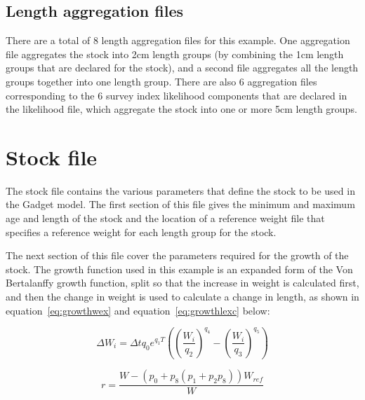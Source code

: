 \documentclass[10pt,titlepage]{article}
\begin{document}
\subsection{Length aggregation files}

There are a total of 8 length aggregation files for this example.  One aggregation file aggregates the stock into 2cm length groups (by combining the 1cm length groups that are declared for the stock), and a second file aggregates all the length groups together into one length group.  There are also 6 aggregation files corresponding to the 6 survey index likelihood components that are declared in the likelihood file, which aggregate the stock into one or more 5cm length groups.

{\small }
{\small }
{\small }
{\small }
{\small }
{\small }
{\small }
{\small }

\section{Stock file}

The stock file contains the various parameters that define the stock to be used in the Gadget model.  The first section of this file gives the minimum and maximum age and length of the stock and the location of a reference weight file that specifies a reference weight for each length group for the stock.

\bigskip
The next section of this file cover the parameters required for the growth of the stock.  The growth function used in this example is an expanded form of the Von Bertalanffy growth function, split so that the increase in weight is calculated first, and then the change in weight is used to calculate a change in length, as shown in equation~\ref{eq:growthwex} and equation~\ref{eq:growthlexc} below:

\begin{equation}\label{eq:growthwex}
\Delta W_i = \Delta t q_0 e^{q_1T}\left(\left( \frac{W_i}{q_2} \right)^{q_4} - \left( \frac{W_i}{q_3} \right)^{q_5} \right)
\end{equation}

\begin{equation}\label{eq:growthlexa}
 r = \frac{W - \left( p_{0} + p_{8} \left( p_{1} + p_{2}p_{8} \right) \right) W_{ref}}{W}
\end{equation}
\end{document}
